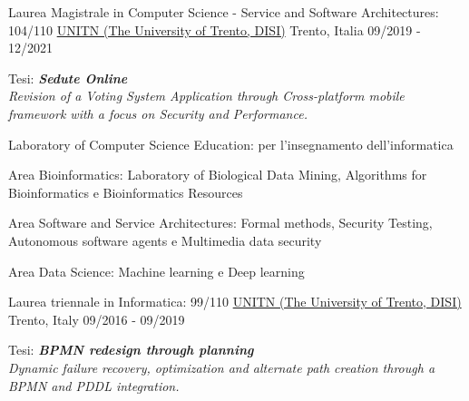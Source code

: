 

\begin{cventries}

\cventry
{Laurea Magistrale in Computer Science - Service and Software Architectures: 104/110} %
{\href{https://www.unitn.it/}{UNITN (The University of Trento, DISI)}}  %
{Trento, Italia} %
{09/2019 - 12/2021} %
{
  \begin{cvitems} %
    \item {Tesi: \textbf{\textit{Sedute Online}}\\\textit{Revision of a Voting System Application through Cross-platform mobile framework with a focus on Security and Performance.}}
    \item {Laboratory of Computer Science Education: per l'insegnamento dell'informatica}
    \item {Area Bioinformatics: Laboratory of Biological Data Mining, Algorithms for Bioinformatics e Bioinformatics Resources}
    \item {Area Software and Service Architectures: Formal methods, Security Testing, Autonomous software agents e Multimedia data security}
    \item {Area Data Science: Machine learning e Deep learning}
  \end{cvitems}
}

\cventry
{Laurea triennale in Informatica: 99/110} %
{\href{https://www.unitn.it/}{UNITN (The University of Trento, DISI)}}  %
{Trento, Italy} %
{09/2016 - 09/2019} %
{
  \begin{cvitems} %
    \item {Tesi: \textbf{\textit{BPMN redesign through planning}} \\\textit{Dynamic failure recovery, optimization and alternate path creation through a BPMN and PDDL integration.}}
  \end{cvitems}
}

\end{cventries}
